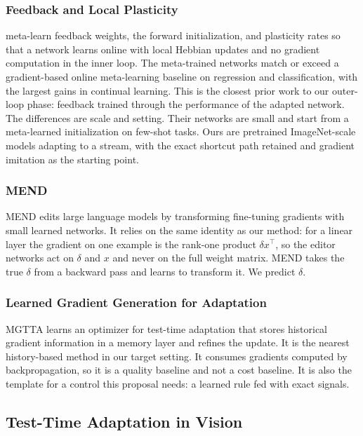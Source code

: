 \documentclass{article}
\begin{document}
\subsubsection{Feedback and Local Plasticity}

\textcite{lindsey2020flp} meta-learn feedback weights, the forward
initialization, and plasticity rates so that a network learns online with local
Hebbian updates and no gradient computation in the inner loop. The meta-trained
networks match or exceed a gradient-based online meta-learning baseline on
regression and classification, with the largest gains in continual learning.
This is the closest prior work to our outer-loop phase: feedback trained
through the performance of the adapted network. The differences are scale and
setting. Their networks are small and start from a meta-learned initialization
on few-shot tasks. Ours are pretrained ImageNet-scale models adapting to a
stream, with the exact shortcut path retained and gradient imitation as the
starting point.

\subsubsection{MEND}

MEND \parencite{mitchell2022mend} edits large language models by transforming
fine-tuning gradients with small learned networks. It relies on the same
identity as our method: for a linear layer the gradient on one example is the
rank-one product $\delta x^\top$, so the editor networks act on $\delta$ and
$x$ and never on the full weight matrix. MEND takes the true $\delta$ from a
backward pass and learns to transform it. We predict $\delta$.

\subsubsection{Learned Gradient Generation for Adaptation}

MGTTA \parencite{deng2025mgtta} learns an optimizer for test-time adaptation
that stores historical gradient information in a memory layer and refines the
update. It is the nearest history-based method in our target setting. It
consumes gradients computed by backpropagation, so it is a quality baseline and
not a cost baseline. It is also the template for a control this proposal needs:
a learned rule fed with exact signals.

\subsection{Test-Time Adaptation in Vision}
\end{document}
